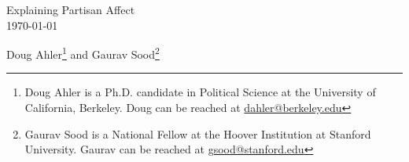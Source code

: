 \documentclass[12pt]{article}
\begin{document}
\doublespacing
\vspace{2cm}

\begin{center}
Explaining Partisan Affect\\
\vspace{2cm}
\today\\\vspace{2cm}

Doug Ahler\footnote{Doug Ahler is a Ph.D. candidate in Political Science at the
University of California, Berkeley. Doug can be reached at
\href{mailto:dahler@berkeley.edu}{dahler@berkeley.edu}} and Gaurav
Sood\footnote{Gaurav Sood is a National Fellow at the Hoover Institution at
Stanford University. Gaurav can be reached at
\href{mailto:gsood@stanford.edu}{gsood@stanford.edu}}

\end{center}

\setcounter{page}{0}
\thispagestyle{empty}
\thispagestyle{empty}

\newpage
\setcounter{footnote}{1}


\begin{comment}
	sweaver(paste0(basedir, "xperceive/partisanResponse"), "presponse")
\end{comment}
\newpage
\end{document}
